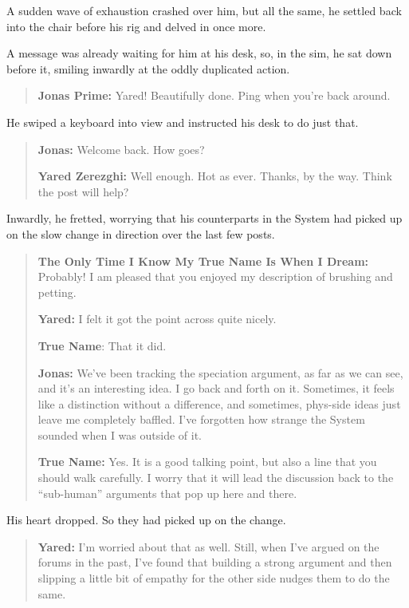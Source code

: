 A sudden wave of exhaustion crashed over him, but all the same, he settled back into the chair before his rig and delved in once more.

A message was already waiting for him at his desk, so, in the sim, he sat down before it, smiling inwardly at the oddly duplicated action.

\begin{quote}
\textbf{Jonas Prime:} Yared! Beautifully done. Ping when you're back around.
\end{quote}

\noindent He swiped a keyboard into view and instructed his desk to do just that.

\begin{quote}
\textbf{Jonas:} Welcome back. How goes?

\textbf{Yared Zerezghi:} Well enough. Hot as ever. Thanks, by the way. Think the post will help?
\end{quote}

\noindent Inwardly, he fretted, worrying that his counterparts in the System had picked up on the slow change in direction over the last few posts.

\begin{quote}
\textbf{The Only Time I Know My True Name Is When I Dream:} Probably! I am pleased that you enjoyed my description of brushing and petting.

\textbf{Yared:} I felt it got the point across quite nicely.

\textbf{True Name}: That it did.

\textbf{Jonas:} We've been tracking the speciation argument, as far as we can see, and it's an interesting idea. I go back and forth on it. Sometimes, it feels like a distinction without a difference, and sometimes, phys-side ideas just leave me completely baffled. I've forgotten how strange the System sounded when I was outside of it.

\textbf{True Name:} Yes. It is a good talking point, but also a line that you should walk carefully. I worry that it will lead the discussion back to the ``sub-human'' arguments that pop up here and there.
\end{quote}

\noindent His heart dropped. So they had picked up on the change.

\begin{quote}
\textbf{Yared:} I'm worried about that as well. Still, when I've argued on the forums in the past, I've found that building a strong argument and then slipping a little bit of empathy for the other side nudges them to do the same.
\end{quote}

